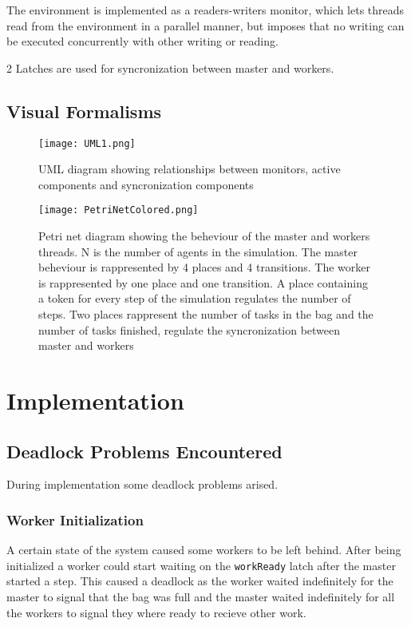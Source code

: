 \documentclass[12pt, a4paper]{report}
\begin{document}
The environment is implemented as a readers-writers monitor, which
 lets threads read from the environment in a parallel manner, but imposes
 that no writing can be executed concurrently with other writing or reading.

2 Latches are used for syncronization between master and workers.

\section{Visual Formalisms}

\begin{figure}
    \centering
    \texttt{[image: UML1.png]}
    \caption{UML diagram showing relationships between monitors, active components and syncronization components}
\end{figure}

\begin{figure}
    \centering
    \texttt{[image: PetriNetColored.png]}
    \caption{Petri net diagram showing the beheviour of the master and workers threads. N is the number of agents in the simulation. The master beheviour is rappresented by 4 places and 4 transitions. The worker is rappresented by one place and one transition. A place containing a token for every step of the simulation regulates the number of steps. Two places rappresent the number of tasks in the bag and the number of tasks finished, regulate the syncronization between master and workers}
\end{figure}

\chapter{Implementation}

\section{Deadlock Problems Encountered}
During implementation some deadlock problems arised.

\subsection{Worker Initialization}
A certain state of the system caused some workers to be left behind.
 After being initialized a worker could start waiting on the \texttt{workReady} latch after
 the master started a step. This caused a deadlock as the worker waited indefinitely
 for the master to signal that the bag was full and the master waited indefinitely for
 all the workers to signal they where ready to recieve other work.
\end{document}
